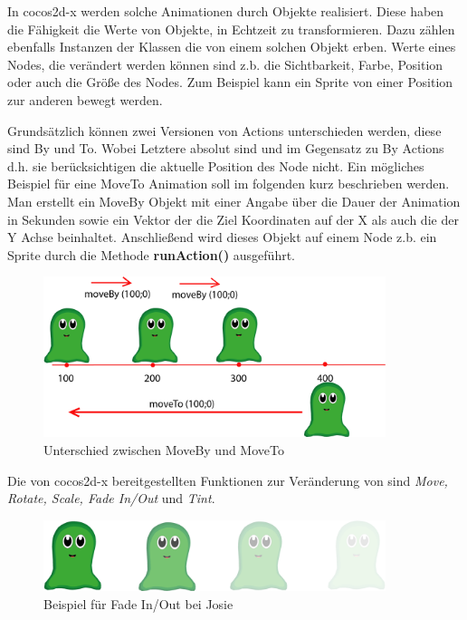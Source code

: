 In cocos2d-x werden solche Animationen durch  Objekte realisiert. Diese haben die Fähigkeit die Werte von  Objekte, in Echtzeit zu transformieren. Dazu zählen ebenfalls Instanzen der Klassen die von einem solchen Objekt erben. Werte eines Nodes, die verändert werden können sind z.b. die Sichtbarkeit, Farbe, Position oder auch die Größe des Nodes. Zum Beispiel kann ein Sprite von einer Position zur anderen bewegt werden.

Grundsätzlich können zwei Versionen von Actions unterschieden werden, diese sind By und To. Wobei Letztere absolut sind und im Gegensatz zu By Actions d.h. sie berücksichtigen die aktuelle Position des Node nicht. Ein mögliches Beispiel für eine MoveTo Animation soll im folgenden kurz beschrieben werden. Man erstellt ein MoveBy Objekt mit einer Angabe über die Dauer der Animation in Sekunden sowie ein Vektor der die Ziel Koordinaten auf der X als auch die der Y Achse beinhaltet. Anschließend wird dieses Objekt auf einem Node z.b. ein Sprite durch die Methode \textbf{runAction()} ausgeführt. 

\begin{figure}[H]
 \centering
  \includegraphics[width=10cm]{resources/josiedoku6}
  \caption{Unterschied zwischen MoveBy und MoveTo}
  \label{fig:josiemoveByTo} 
\end{figure}

Die von cocos2d-x bereitgestellten Funktionen zur Veränderung von  sind \textit{Move, Rotate, Scale, Fade In/Out} und \textit{Tint}.

\begin{figure}[H]
 \centering
  \includegraphics[width=10cm]{resources/josiedoku5}
  \caption{Beispiel für Fade In/Out bei Josie}
  \label{fig:fade} 
\end{figure}


